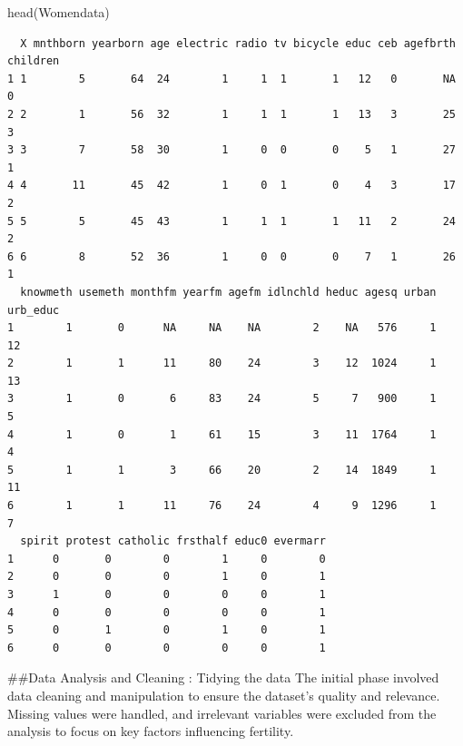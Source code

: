 \documentclass[
  letterpaper,
  DIV=11,
  numbers=noendperiod]{scrartcl}
\newenvironment{Shaded}{\begin{snugshade}}{\end{snugshade}}
\newcommand{\FunctionTok}[1]{\textcolor[rgb]{0.28,0.35,0.67}{#1}}
\newcommand{\NormalTok}[1]{\textcolor[rgb]{0.00,0.23,0.31}{#1}}
\begin{document}
\begin{Shaded}
\begin{Highlighting}[]
\FunctionTok{head}\NormalTok{(Womendata)}
\end{Highlighting}
\end{Shaded}

\begin{verbatim}
  X mnthborn yearborn age electric radio tv bicycle educ ceb agefbrth children
1 1        5       64  24        1     1  1       1   12   0       NA        0
2 2        1       56  32        1     1  1       1   13   3       25        3
3 3        7       58  30        1     0  0       0    5   1       27        1
4 4       11       45  42        1     0  1       0    4   3       17        2
5 5        5       45  43        1     1  1       1   11   2       24        2
6 6        8       52  36        1     0  0       0    7   1       26        1
  knowmeth usemeth monthfm yearfm agefm idlnchld heduc agesq urban urb_educ
1        1       0      NA     NA    NA        2    NA   576     1       12
2        1       1      11     80    24        3    12  1024     1       13
3        1       0       6     83    24        5     7   900     1        5
4        1       0       1     61    15        3    11  1764     1        4
5        1       1       3     66    20        2    14  1849     1       11
6        1       1      11     76    24        4     9  1296     1        7
  spirit protest catholic frsthalf educ0 evermarr
1      0       0        0        1     0        0
2      0       0        0        1     0        1
3      1       0        0        0     0        1
4      0       0        0        0     0        1
5      0       1        0        1     0        1
6      0       0        0        0     0        1
\end{verbatim}

\#\#Data Analysis and Cleaning : Tidying the data The initial phase
involved data cleaning and manipulation to ensure the dataset's quality
and relevance. Missing values were handled, and irrelevant variables
were excluded from the analysis to focus on key factors influencing
fertility.
\end{document}
